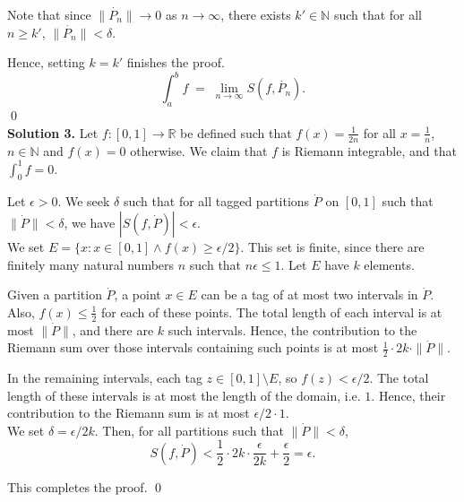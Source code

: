 \documentclass[10pt]{article}
\begin{document}
        Note that since $\|\dot{P_n}\| \to 0$ as $n \to \infty$, there exists $k' \in \mathbb{N}$ such that for all $n \ge k'$,
        $\|\dot{P_n}\| < \delta$.

        Hence, setting $k = k'$ finishes the proof.
        \[\int_a^b f \;=\; \lim_{n \to \infty} S(f, \dot{P_n}).\] \qed\\

        \textbf{Solution 3.}
        Let $f\colon [0, 1] \to \mathbb{R}$ be defined such that $f(x) = \frac{1}{2n}$ for all $x = \frac{1}{n}$, $n \in \mathbb{N}$ and
        $f(x) = 0$ otherwise. We claim that $f$ is Riemann integrable, and that $\int_0^1 f = 0$.

        Let $\epsilon > 0$. We seek $\delta$ such that for all tagged partitions $\dot{P}$ on $[0, 1]$ such that $\|\dot{P}\| < \delta$,
        we have $|S(f, \dot{P})| < \epsilon$. \\

        We set $E = \{x : x \in [0, 1] \land f(x) \ge \epsilon/2\}$. This set is finite, since there are finitely many natural 
        numbers $n$ such that $n\epsilon \le 1$. Let $E$ have $k$ elements.
        
        Given a partition $\dot{P}$, a point $x \in E$ can
        be a tag of at most two intervals in $\dot{P}$. Also, $f(x) \le \frac{1}{2}$ for each of these points.
        The total length of each interval is at most $\|\dot{P}\|$, and there are $k$ such intervals.
        Hence, the contribution to the Riemann sum over those intervals containing such points is at most $\frac{1}{2}\cdot 2k\cdot \|\dot{P}\|$.
        
        In the remaining intervals, each tag $z \in [0, 1]\setminus E$, so $f(z) < \epsilon/2$. The total length of these intervals
        is at most the length of the domain, i.e. $1$. Hence, their contribution to the Riemann sum is at most $\epsilon/2 \cdot 1$.\\
        
        We set $\delta = \epsilon/2k$. Then, for all partitions such that $\|\dot{P}\| < \delta$,
        \[S(f, \dot{P}) < \frac{1}{2}\cdot 2k\cdot \frac{\epsilon}{2k} + \frac{\epsilon}{2} = \epsilon.\]

        This completes the proof. \qed\\
\end{document}
